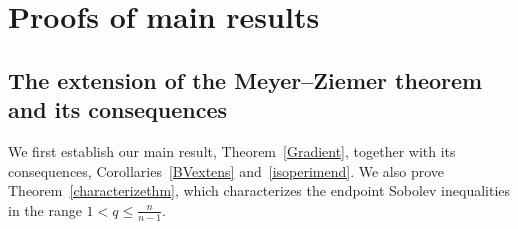 \documentclass[11pt, a4paper, reqno]{amsart}
\newcommand{\dx}{\,{\mathrm dx}}
\newcommand{\Ldash}{\textup{\L}}
\theoremstyle{definition}
\theoremstyle{remark}
\begin{document}



\section{Proofs of main results}\label{Master}

\subsection{The extension of the Meyer--Ziemer theorem and its consequences}

We first establish our main result, Theorem~\ref{Gradient}, together with its consequences, Corollaries~\ref{BVextens} and~\ref{isoperimend}. We also prove Theorem~\ref{characterizethm}, which characterizes the endpoint Sobolev inequalities in the range $1<q\leq \frac{n}{n-1}$.
\end{document}
